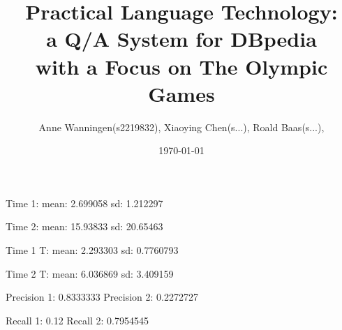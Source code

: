 \documentclass{article}
\title{ {\small Practical Language Technology:}\\{\Large a Q/A System for DBpedia}\\{\small with a Focus on The Olympic Games}}
\date{\today}
\author{
  {\small Anne Wanningen}{\tiny(s2219832)},
  {\small Xiaoying Chen}{\tiny(s...)}, 
  {\small Roald Baas}{\tiny(s...)}, 
}
\begin{document}
\maketitle


\section{} %



\section{} %



\section{} %



\section{} %



\section{} %
Time 1:
mean: 	2.699058
sd:   	1.212297

Time 2:
mean: 	15.93833
sd:   	20.65463


Time 1 T:
mean: 	2.293303
sd:   	0.7760793

Time 2 T:
mean: 	6.036869
sd:   	3.409159


Precision 1:	0.8333333
Precision 2:	0.2272727

Recall 1:	0.12
Recall 2:	0.7954545


\section{} %



\section{} %
\end{document}
